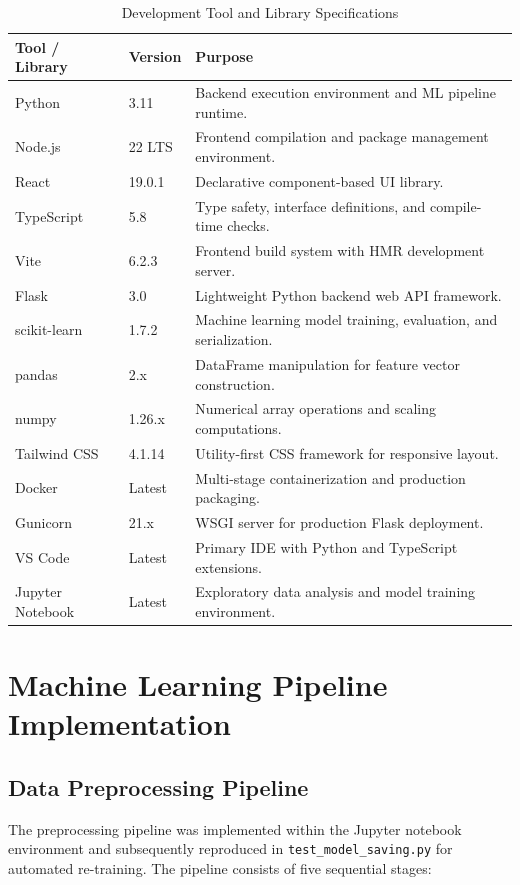 \documentclass[12pt,a4paper]{report}
\begin{document}
\begin{table}[H]
\centering
\caption{Development Tool and Library Specifications}
\label{tab:dev_environment}
\begin{tabularx}{\textwidth}{llX}
\toprule
\textbf{Tool / Library} & \textbf{Version} & \textbf{Purpose} \\
\midrule
Python           & 3.11     & Backend execution environment and ML pipeline runtime. \\
Node.js          & 22 LTS   & Frontend compilation and package management environment. \\
React            & 19.0.1   & Declarative component-based UI library. \\
TypeScript       & 5.8      & Type safety, interface definitions, and compile-time checks. \\
Vite             & 6.2.3    & Frontend build system with HMR development server. \\
Flask            & 3.0      & Lightweight Python backend web API framework. \\
scikit-learn     & 1.7.2    & Machine learning model training, evaluation, and serialization. \\
pandas           & 2.x      & DataFrame manipulation for feature vector construction. \\
numpy            & 1.26.x   & Numerical array operations and scaling computations. \\
Tailwind CSS     & 4.1.14   & Utility-first CSS framework for responsive layout. \\
Docker           & Latest   & Multi-stage containerization and production packaging. \\
Gunicorn         & 21.x     & WSGI server for production Flask deployment. \\
VS Code          & Latest   & Primary IDE with Python and TypeScript extensions. \\
Jupyter Notebook & Latest   & Exploratory data analysis and model training environment. \\
\bottomrule
\end{tabularx}
\end{table}

\section{Machine Learning Pipeline Implementation}

\subsection{Data Preprocessing Pipeline}
The preprocessing pipeline was implemented within the Jupyter notebook environment and subsequently reproduced in \texttt{test\_model\_saving.py} for automated re-training. The pipeline consists of five sequential stages:
\end{document}
